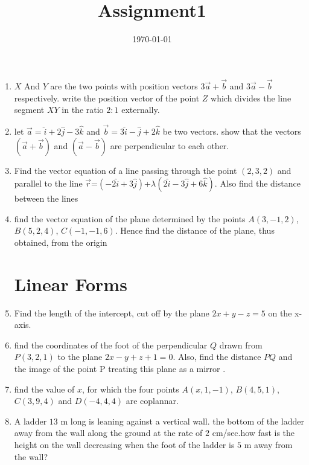 \documentclass[12pt,-letter paper]{article}
\title{Assignment1}
\date{\today}
\providecommand{\brak}[1]{\ensuremath{\left(#1\right)}}
\begin{document}
\begin{enumerate}
\section{vector}
\item $X$ And $Y$ are the two points with position vectors $3\overrightarrow{a}+\overrightarrow{b}$ and $3\overrightarrow{a}-\overrightarrow{b}$ respectively. write the position vector of the point $Z$ which divides the line segment $XY$ in the ratio $2:1$ externally.
\item let $\overrightarrow{a}=\hat{i}+2\hat{j}-3\hat{k}$ and $\overrightarrow{b}=3\hat{i}-\hat{j}+2\hat{k}$ be two vectors. show that the vectors $\brak{\overrightarrow{a}+\overrightarrow{b}}$ and $\brak{\overrightarrow{a}-\overrightarrow{b}}$ are perpendicular to each other.
 \item Find the vector equation of a line passing through the point $\brak{2,3,2}$ and parallel to the line $\overrightarrow{r}$=$\brak {-2\hat{i}+3\hat{j}}$+${\lambda\brak{2\hat{i}-3\hat{j}+6\hat{k}}}$. Also find the distance between the lines
 \item find the vector equation of the plane determined by the points  $A\brak{3,-1,2}$, $B\brak{5,2,4}$, $C\brak{-1,-1,6}$. Hence find the distance of the plane, thus obtained, from the origin 
 \section{Linear Forms}
 \item Find the length of the intercept, cut off by the plane $2x+y-z=5$ on the x-axis.
 \item find the coordinates of the foot of the perpendicular $Q$ drawn from $P\brak{3,2,1}$ to the plane $2x-y+z+1=0$. Also, find the distance $PQ$ and the image of the point P treating this plane as a mirror .
 \item find the value of $x$, for which the four points $A\brak{x,1,-1}$, $B\brak{4,5,1}$, $C\brak{3,9,4}$ and $D\brak{-4,4,4}$ are coplannar. 
\item A ladder $13$ m long is leaning against a vertical wall. the bottom of the ladder away from the wall along the ground at the rate of $2$ cm/sec.how fast is the height on the wall decreasing when the foot of the ladder is $5$ m away from the wall?

\end{enumerate}
\end{document}
